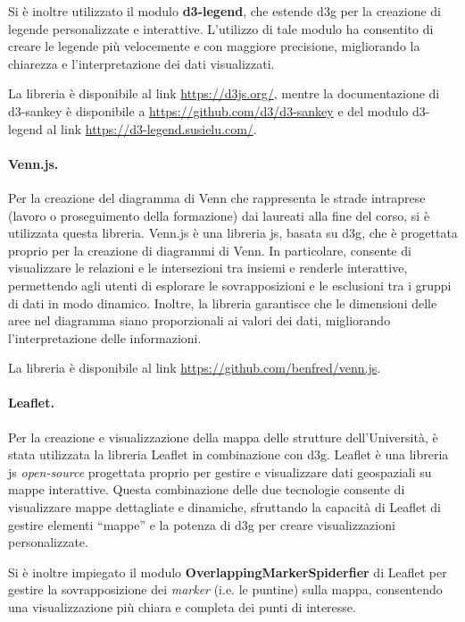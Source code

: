 Si è inoltre utilizzato il modulo \textbf{d3-legend}, che estende \gls{d3g} per la creazione di legende personalizzate e interattive. L'utilizzo di tale modulo ha 
consentito di creare le legende più velocemente e con maggiore precisione, migliorando la chiarezza e l'interpretazione dei dati visualizzati. 

La libreria è disponibile al link \href{https://d3js.org/}{https://d3js.org/}, mentre la documentazione di d3-sankey è disponibile a \href{https://github.com/d3/d3-sankey}{https://github.com/d3/d3-sankey} e del modulo d3-legend 
al link \href{https://d3-legend.susielu.com/}{https://d3-legend.susielu.com/}.

\paragraph{Venn.js.} 
Per la creazione del diagramma di Venn che rappresenta le strade intraprese (lavoro o proseguimento della formazione) dai laureati alla fine del corso, si è utilizzata questa libreria.
Venn.js è una libreria \gls{js}, basata su \gls{d3g}, che è progettata proprio per la creazione di diagrammi di Venn. 
In particolare, consente di visualizzare le relazioni e le intersezioni tra insiemi e renderle interattive, permettendo agli utenti di esplorare le sovrapposizioni e le esclusioni tra i gruppi di dati in modo dinamico. 
Inoltre, la libreria garantisce che le dimensioni delle aree nel diagramma siano proporzionali ai valori dei dati, migliorando l'interpretazione delle informazioni. 

La libreria è disponibile al link \href{https://github.com/benfred/venn.js}{https://github.com/benfred/venn.js}.

\paragraph{Leaflet.} 
Per la creazione e visualizzazione della mappa delle strutture dell'Università, è stata utilizzata la libreria Leaflet in combinazione con \gls{d3g}. 
Leaflet è una libreria \gls{js} \emph{open-source} progettata proprio per gestire e visualizzare dati geospaziali su mappe interattive.
Questa combinazione delle due tecnologie consente di visualizzare mappe dettagliate e dinamiche, sfruttando la capacità di Leaflet di gestire elementi ``mappe''
e la potenza di \gls{d3g} per creare visualizzazioni personalizzate.

Si è inoltre impiegato il modulo \textbf{OverlappingMarkerSpiderfier} di Leaflet per gestire la sovrapposizione dei \emph{marker} (i.e. le puntine) sulla mappa, consentendo 
una visualizzazione più chiara e completa dei punti di interesse.

